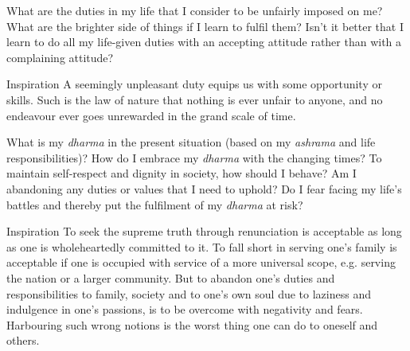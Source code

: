 \newpage
\begin{mananam}{}
\mananamtext What are the duties in my life that I consider to be unfairly imposed on me? What are the brighter side of things if I learn to fulfil them? Isn’t it better that I learn to do all my life-given duties with an accepting attitude rather than with a complaining attitude?
\end{mananam}
\WritingHand{}
\begin{inspiration}{\mananamfont Inspiration}
\mananamtext A seemingly unpleasant duty equips us with some opportunity or skills. Such is the law of nature that nothing is ever unfair to anyone, and no endeavour ever goes unrewarded in the grand scale of time.
\end{inspiration}
\newpage


\newpage
\begin{mananam}{}
\mananamtext What is my \emph{dharma} in the present situation (based on my \emph{ashrama} and life responsibilities)? How do I embrace my \emph{dharma} with the changing times? To maintain self-respect and dignity in society, how should I behave? Am I abandoning any duties or values that I need to uphold? Do I fear facing my life’s battles and thereby put the fulfilment of my \emph{dharma} at risk?
\end{mananam}
\WritingHand{}
\begin{inspiration}{\mananamfont Inspiration}
\mananamtext To seek the supreme truth through renunciation is acceptable as long as one is wholeheartedly committed to it. To fall short in serving one’s family is acceptable if one is occupied with service of a more universal scope, e.g. serving the nation or a larger community. But to abandon one’s duties and responsibilities to family, society and to one’s own soul due to laziness and indulgence in one’s passions, is to be overcome with negativity and fears. Harbouring such wrong notions is the worst thing one can do to oneself and others.
\end{inspiration}
\newpage


